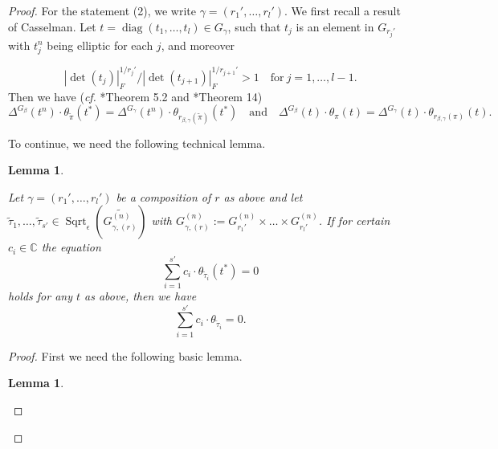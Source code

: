 \documentclass{amsart}
\numberwithin{equation}{section}
\newtheorem{lemma}[theorem]{\bf{Lemma}}
\newcommand{\abs}[1]{\left|#1\right|_{F}}
\newcommand{\mrdet}{\operatorname{det}}
\newcommand{\mrdiag}{\operatorname{diag}}
\newcommand{\mrsqrt}{\operatorname{Sqrt}}
\newcommand{\mbc}{\mathbb{C}}
\newcommand{\wt}[1]{\widetilde{#1}}
\begin{document}
\begin{proof}
		For the statement (2), we write $\gamma=(r_{1}',\dots,r_{l}')$. We first recall a result of Casselman. %
		Let $t=\mrdiag(t_{1},\dots,t_{l})\in G_{\gamma}$, such that $t_{j}$ is an element in $G_{r_{j}'}$ with $t_{j}^{n}$ being elliptic for each $j$, and moreover
		\item\begin{equation}\label{eqcondtidi+1}
			\abs{\mrdet(t_{j})}^{1/r_{j}'}/\abs{\mrdet(t_{j+1})}^{1/r_{j+1}'}>1\quad \text{for}\ j=1,\dots,l-1.
		\end{equation} 
		Then we have %
		(\emph{cf.} \cite{casselman1977characters}*{Theorem 5.2} and \cite{flicker1986metaplectic}*{Theorem 14}) 
		\begin{equation}\label{eqHCcharJac}
			\Delta^{G_{\beta}}(t^{n})\cdot\theta_{\wt{\pi}}(t^{*})=\Delta^{G_{\gamma}}(t^{n})\cdot\theta_{r_{\beta,\gamma}(\wt{\pi})}(t^{*})\quad\text{and}\quad\Delta^{G_{\beta}}(t)\cdot\theta_{\pi}(t)=\Delta^{G_{\gamma}}(t)\cdot\theta_{r_{\beta,\gamma}(\pi)}(t).
		\end{equation}
		
		To continue, we need the following technical lemma. 
		
		\begin{lemma}\label{lemmalinearrelasqrtrep}
			
			Let $\gamma=(r_{1}',\dots,r_{l}')$ be a composition of $r$ as above and let $\wt{\tau}_{1},\dots,\wt{\tau}_{s'}\in\mrsqrt_{\epsilon}(\wt{G^{(n)}_{\gamma,(r)}})$ with $G^{(n)}_{\gamma,(r)}:=G_{r_{1}'}^{(n)}\times\dots\times G_{r_{l}'}^{(n)}$. If for certain $c_{i}\in\mbc$ the equation
			\begin{equation}\label{eqTrtau'ici}
				\sum_{i=1}^{s'}c_{i}\cdot\theta_{\wt{\tau}_{i}}(t^{*})=0
			\end{equation}
			holds for any $t$ as above, then we have 
			$$\sum_{i=1}^{s'}c_{i}\cdot\theta_{\wt{\tau}_{i}}=0.$$
		\end{lemma}
		
		\begin{proof}
			
			First we need the following basic lemma.
			
			\begin{lemma}\label{lemmasigmalinearindep}
				

\end{lemma}
\end{proof}
\end{proof}
\end{document}
